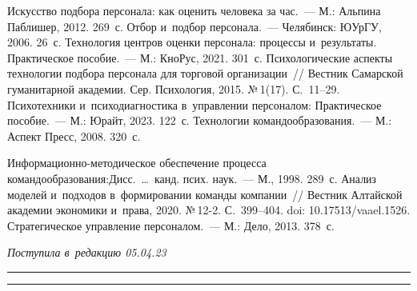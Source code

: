 \begin{multicols}{2}
{{\begin{thebibliography}{99}
 Искусство подбора персонала: как оценить человека за час.~--- М.: 
Альпина Паблишер, 2012. 269~с.
 Отбор и~под\-бор персонала.~--- Челябинск: ЮУрГУ, 2006. 
26~с.
 Технология цент\-ров оцен\-ки персонала: процессы и~результаты. 
Практическое пособие.~--- М.: КноРус, 2021. 301~с.
 Психологические аспекты технологии подбора персонала для 
торговой организации~// Вестник Самарской гуманитарной академии. Сер. Психология, 
2015. №\,1(17). С.~11--29.
 Психотехники и~пси\-хо\-диа\-гно\-сти\-ка в~управ\-ле\-нии персоналом: 
Практическое пособие.~--- М.: Юрайт, 2023. 122~с.
 Технологии командообразования.~--- М.: 
Аспект Пресс, 2008. 320~с.

\pagebreak

 Информационно-ме\-то\-ди\-че\-ское обеспечение процесса 
командообразования:\linebreak Дисс.\ \ldots\  канд. псих. наук.~--- М., 1998. 289~с.
 Анализ моделей и~подходов в~формировании команды компании~// 
Вестник Алтайской академии экономики и~права, 2020. №\,12-2. С.~399--404. doi: 
10.17513/vaael.1526.
 Стратегическое управ\-ле\-ние персоналом.~--- М.: 
Дело, 2013. 378~с.

\end{thebibliography}

 }
 }

\end{multicols}

\vspace*{-6pt}

\hfill{\small\textit{Поступила в~редакцию 05.04.23}}

\vspace*{8pt}




\hrule

\vspace*{2pt}

\hrule


\def\tit{SELECTION OF SPECIALISTS IN~THE~ORGANIZATION OF~COLLECTIVE SOLVING 
PROBLEMS}


